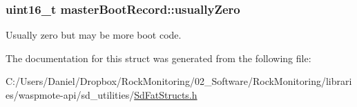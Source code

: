 \subsubsection[{\texorpdfstring{usually\+Zero}{usuallyZero}}]{\setlength{\rightskip}{0pt plus 5cm}uint16\+\_\+t master\+Boot\+Record\+::usually\+Zero}\hypertarget{structmaster_boot_record_afacfc863e98f64053cd9459c6dec948f}{}\label{structmaster_boot_record_afacfc863e98f64053cd9459c6dec948f}
Usually zero but may be more boot code. 

The documentation for this struct was generated from the following file\+:\begin{DoxyCompactItemize}
\item 
C\+:/\+Users/\+Daniel/\+Dropbox/\+Rock\+Monitoring/02\+\_\+\+Software/\+Rock\+Monitoring/libraries/waspmote-\/api/sd\+\_\+utilities/\hyperlink{_sd_fat_structs_8h}{Sd\+Fat\+Structs.\+h}\end{DoxyCompactItemize}
